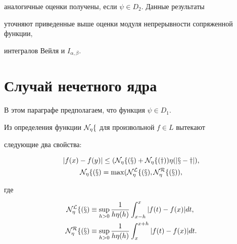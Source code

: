 аналогичные оценки получены, если $\psi\in D_2$. Данные результаты


уточняют приведенные выше оценки модуля непрерывности сопряженной функции,


интегралов Вейля и $I_{\alpha,\beta}$.








\section{Случай нечетного ядра}





В этом параграфе предполагаем, что функция $\psi\in D_1$.


Из определения функции $\cal N_\eta f$ для произвольной $f\in L$ вытекают


следующие два свойства:


\begin{gather}


|f(x)-f(y)|\le(\N_\eta f(x)+\N_\eta f(y))\eta(|x-y|),\\


\N_\eta f(x)=\max(\N_\eta^Lf(x),\N_\eta^Rf(x)),


\end{gather}


где


\begin{align*}


\N_\eta^Lf(x)&\equiv\sup_{h>0}\frac{1}{h\eta(h)}\int_{x-h}^x|f(t)-f(x)|dt,\\


\N_\eta^Rf(x)&\equiv\sup_{h>0}\frac{1}{h\eta(h)}\int^{x+h}_x|f(t)-f(x)|dt.


\end{align*}





